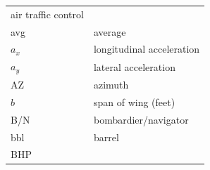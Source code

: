 \documentclass[
]{book}
\begin{document}
\begin{longtable}[]{@{}ll@{}}
\begin{minipage}[t]{0.47\columnwidth}
air traffic control\strut
\end{minipage}\tabularnewline
\begin{minipage}[t]{0.47\columnwidth}\raggedright
avg\strut
\end{minipage} & \begin{minipage}[t]{0.47\columnwidth}\raggedright
average\strut
\end{minipage}\tabularnewline
\begin{minipage}[t]{0.47\columnwidth}\raggedright
\(a_x\)\strut
\end{minipage} & \begin{minipage}[t]{0.47\columnwidth}\raggedright
longitudinal acceleration\strut
\end{minipage}\tabularnewline
\begin{minipage}[t]{0.47\columnwidth}\raggedright
\(a_y\)\strut
\end{minipage} & \begin{minipage}[t]{0.47\columnwidth}\raggedright
lateral acceleration\strut
\end{minipage}\tabularnewline
\begin{minipage}[t]{0.47\columnwidth}\raggedright
AZ\strut
\end{minipage} & \begin{minipage}[t]{0.47\columnwidth}\raggedright
azimuth\strut
\end{minipage}\tabularnewline
\begin{minipage}[t]{0.47\columnwidth}\raggedright
\(b\)\strut
\end{minipage} & \begin{minipage}[t]{0.47\columnwidth}\raggedright
span of wing (feet)\strut
\end{minipage}\tabularnewline
\begin{minipage}[t]{0.47\columnwidth}\raggedright
B/N\strut
\end{minipage} & \begin{minipage}[t]{0.47\columnwidth}\raggedright
bombardier/navigator\strut
\end{minipage}\tabularnewline
\begin{minipage}[t]{0.47\columnwidth}\raggedright
bbl\strut
\end{minipage} & \begin{minipage}[t]{0.47\columnwidth}\raggedright
barrel\strut
\end{minipage}\tabularnewline
\begin{minipage}[t]{0.47\columnwidth}\raggedright
BHP\strut
\end{minipage} & \begin{minipage}[t]{0.47\columnwidth}\raggedright

\end{minipage}
\end{longtable}
\end{document}
